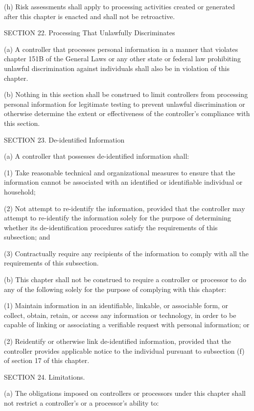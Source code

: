 (h) Risk assessments shall apply to processing activities created or generated after this chapter is enacted and shall not be retroactive.

SECTION 22. Processing That Unlawfully Discriminates

(a) A controller that processes personal information in a manner that violates chapter 151B of the General Laws or any other state or federal law prohibiting unlawful discrimination against individuals shall also be in violation of this chapter.

(b) Nothing in this section shall be construed to limit controllers from processing personal information for legitimate testing to prevent unlawful discrimination or otherwise determine the extent or effectiveness of the controller’s compliance with this section.

SECTION 23. De-identified Information

(a) A controller that possesses de-identified information shall:

(1) Take reasonable technical and organizational measures to ensure that the information cannot be associated with an identified or identifiable individual or household;

(2) Not attempt to re-identify the information, provided that the controller may attempt to re-identify the information solely for the purpose of determining whether its de-identification procedures satisfy the requirements of this subsection; and

(3) Contractually require any recipients of the information to comply with all the requirements of this subsection.  

(b) This chapter shall not be construed to require a controller or processor to do any of the following solely for the purpose of complying with this chapter:

(1) Maintain information in an identifiable, linkable, or associable form, or collect, obtain, retain, or access any information or technology, in order to be capable of linking or associating a verifiable request with personal information; or

(2) Reidentify or otherwise link de-identified information, provided that the controller provides applicable notice to the individual pursuant to subsection (f) of section 17 of this chapter. 

SECTION 24. Limitations.

(a) The obligations imposed on controllers or processors under this chapter shall not restrict a controller’s or a processor’s ability to:

